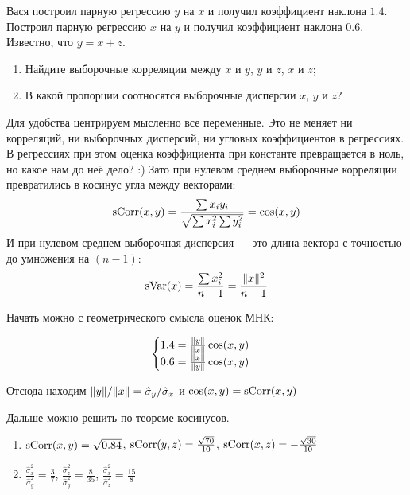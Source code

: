 \begin{problem}
Вася построил парную регрессию $y$ на $x$ и получил коэффициент наклона $1.4$. Построил парную регрессию $x$ на $y$ и получил коэффициент наклона $0.6$. Известно, что $y=x+z$.
\begin{enumerate}
    \item Найдите выборочные корреляции между $x$ и $y$, $y$ и $z$, $x$ и $z$;
    \item В какой пропорции соотносятся выборочные дисперсии $x$, $y$ и $z$?
\end{enumerate}
\begin{sol}
Для удобства центрируем мысленно все переменные. Это не меняет ни корреляций,
ни выборочных дисперсий, ни угловых коэффициентов в регрессиях.
В регрессиях при этом оценка коэффициента при константе превращается в ноль, но какое нам до неё дело? :)
Зато при нулевом среднем выборочные корреляции превратились в косинус угла между векторами:
\[
\operatorname{sCorr}(x,y) = \frac{\sum x_i y_i}{ \sqrt{\sum x_i^2 \sum y_i^2}} = \cos(x, y)
\]
И при нулевом среднем выборочная дисперсия — это длина вектора с точностью до умножения на $(n-1)$:
\[
\operatorname{sVar}(x) = \frac{\sum x_i^2}{n-1} = \frac{\lVert x\rVert^2}{n-1}
\]

Начать можно с геометрического смысла оценок МНК:

\[
\begin{cases}
1.4 = \frac{\lVert y\rVert}{\lVert x\rVert}\cos(x, y) \\
0.6 = \frac{\lVert x\rVert}{\lVert y\rVert}\cos(x, y) \\
\end{cases}
\]

Отсюда находим $\lVert y\rVert/\lVert x\rVert = \hat{\sigma}_y / \hat{\sigma}_x$ и $\cos(x,y)=\operatorname{sCorr}(x,y)$

Дальше можно решить по теореме косинусов.

\begin{enumerate}
\item $\operatorname{sCorr}(x,y) = \sqrt{0.84}$, $\operatorname{sCorr}(y,z) = \frac{\sqrt{70}}{10}$,
$\operatorname{sCorr}(x,z) = -\frac{\sqrt{30}}{10}$
\item $\frac{\hat{\sigma}_x^2}{\hat{\sigma}_y^2} = \frac{3}{7}$,
$\frac{\hat{\sigma}_z^2}{\hat{\sigma}_y^2} = \frac{8}{35}$,
$\frac{\hat{\sigma}_x^2}{\hat{\sigma}_z^2} = \frac{15}{8}$
\end{enumerate}
\end{sol}
\end{problem}


